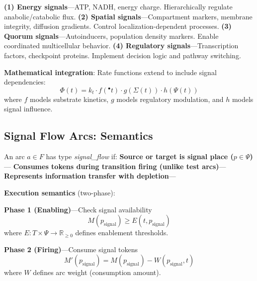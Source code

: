 \vspace{3pt}
\noindent\textbf{(1) \textbf{Energy signals}}---ATP, NADH, energy charge. Hierarchically regulate anabolic/catabolic flux. \textbf{(2) \textbf{Spatial signals}}---Compartment markers, membrane integrity, diffusion gradients. Control localization-dependent processes. \textbf{(3) \textbf{Quorum signals}}---Autoinducers, population density markers. Enable coordinated multicellular behavior. \textbf{(4) \textbf{Regulatory signals}}---Transcription factors, checkpoint proteins. Implement decision logic and pathway switching.

\vspace{3pt}
\noindent\textbf{Mathematical integration}: Rate functions extend to include signal dependencies:
\[
\Phi(t) = k_t \cdot f({}^\bullet t) \cdot g(\Sigma(t)) \cdot h(\Psi(t))
\]
where $f$ models substrate kinetics, $g$ models regulatory modulation, and $h$ models signal influence.

\subsection{Signal Flow Arcs: Semantics}

\begin{definition}
An arc $a \in F$ has type \textit{signal\_flow} if:
\textbf{Source or target is signal place ($p \in \Psi$)}--- \textbf{Consumes tokens during transition firing (unlike test arcs)}--- \textbf{Represents information transfer with depletion}---
\end{definition}

\vspace{3pt}
\noindent\textbf{Execution semantics} (two-phase):

\noindent\textbf{Phase 1 (Enabling)}---Check signal availability
\[
M(p_{\text{signal}}) \geq E(t, p_{\text{signal}})
\]
where $E: T \times \Psi \to \mathbb{R}_{\geq 0}$ defines enablement thresholds.

\noindent\textbf{Phase 2 (Firing)}---Consume signal tokens
\[
M'(p_{\text{signal}}) = M(p_{\text{signal}}) - W(p_{\text{signal}}, t)
\]
where $W$ defines arc weight (consumption amount).

